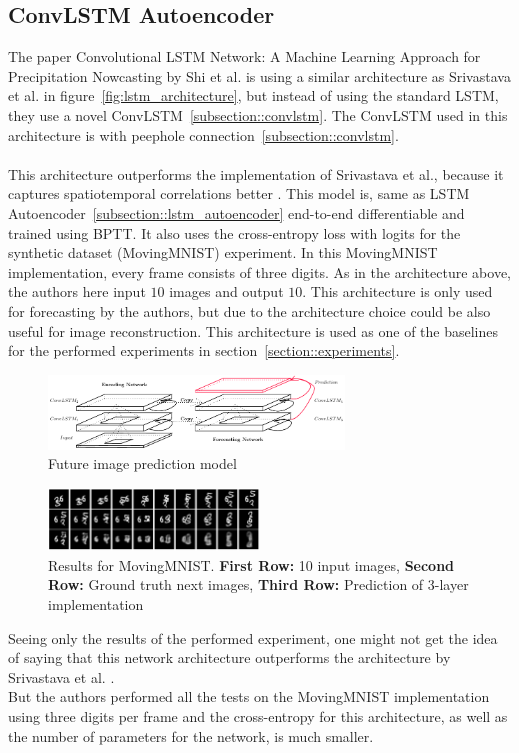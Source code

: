  \subsection{ConvLSTM Autoencoder} \label{subsection::convlstm_autoencoder}
  The paper \glqq Convolutional LSTM Network: A Machine Learning Approach for Precipitation Nowcasting\grqq{} by Shi et al. \citep{Shi2015} is using a similar 
  architecture as Srivastava et al. in
  figure~\ref{fig:lstm_architecture}, but instead of using the standard LSTM, they use a novel ConvLSTM~\ref{subsection::convlstm}. The ConvLSTM used in this 
  architecture is with peephole connection~\ref{subsection::convlstm}.
  \\\\
  This architecture outperforms the implementation of Srivastava et al., because it \glqq captures spatiotemporal correlations better\grqq{} \cite{Shi2015}.
  This model is, same as LSTM Autoencoder~\ref{subsection::lstm_autoencoder} end-to-end differentiable and trained using BPTT. It also uses the cross-entropy loss with logits for the synthetic dataset 
  (MovingMNIST) experiment. In this MovingMNIST implementation, every frame consists of three digits. As in the architecture above, the authors here input $10$ images and output $10$. This architecture is only used for forecasting by the authors, but due to the architecture choice could be also useful for image
  reconstruction. This architecture is used as one of the baselines for the performed experiments in section~\ref{section::experiments}.
  \begin{figure}[H]
   \includegraphics[width=0.7\textwidth]{../Images/shi.png}
   \centering
   \caption{Future image prediction model \cite{Shi2015}}
   \label{fig:convlstm_architecture}
  \end{figure}
  \begin{figure}[H]
   \includegraphics[width=0.5\textwidth]{../Images/shi_results_mnist.png}
   \centering
   \caption{Results for MovingMNIST. \textbf{First Row:} 10 input images, \textbf{Second Row:} Ground truth next images, \textbf{Third Row:} Prediction of 3-layer implementation \cite{Shi2015}}
   \label{fig:convlstm_results}
  \end{figure}\noindent
  Seeing only the results of the performed experiment, one might not get the idea of saying that this network architecture outperforms the architecture by
  Srivastava et al. \cite{Srivastava2015}.\\
  But the authors performed all the tests on the MovingMNIST implementation using three digits per frame and the
  cross-entropy for this architecture, as well as the number of parameters for the network, is much smaller.
 
